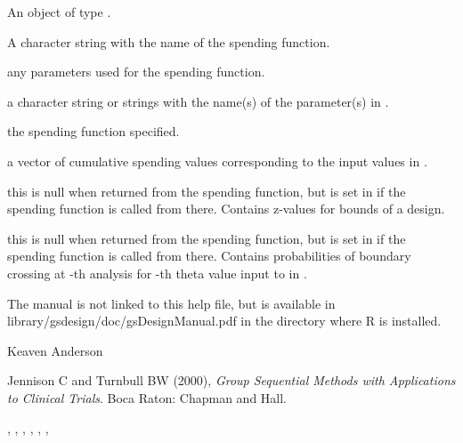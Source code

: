 \begin{Value}
An object of type .
\begin{ldescription}
\item[\code{name}] A character string with the name of the spending function.
\item[\code{param}] any parameters used for the spending function.
\item[\code{parname}] a character string or strings with the name(s) of the parameter(s) in .
\item[\code{sf}] the spending function specified.
\item[\code{spend}] a vector of cumulative spending values corresponding to the input values in .
\item[\code{bound}] this is null when returned from the spending function, 
but is set in  if the spending function is called from there. 
Contains z-values for bounds of a design.
\item[\code{prob}] this is null when returned from the spending function, 
but is set in  if the spending function is called from there. 
Contains probabilities of boundary crossing at -th analysis for -th theta value 
input to  in .
\end{ldescription}
\end{Value}
\begin{Note}\relax
The manual is not linked to this help file, but is available in library/gsdesign/doc/gsDesignManual.pdf
in the directory where R is installed.
\end{Note}
\begin{Author}\relax
Keaven Anderson 
\end{Author}
\begin{References}\relax
Jennison C and Turnbull BW (2000), \emph{Group Sequential Methods with Applications to Clinical Trials}.
Boca Raton: Chapman and Hall.
\end{References}
\begin{SeeAlso}\relax
{}, , , 
, , , 
\end{SeeAlso}

